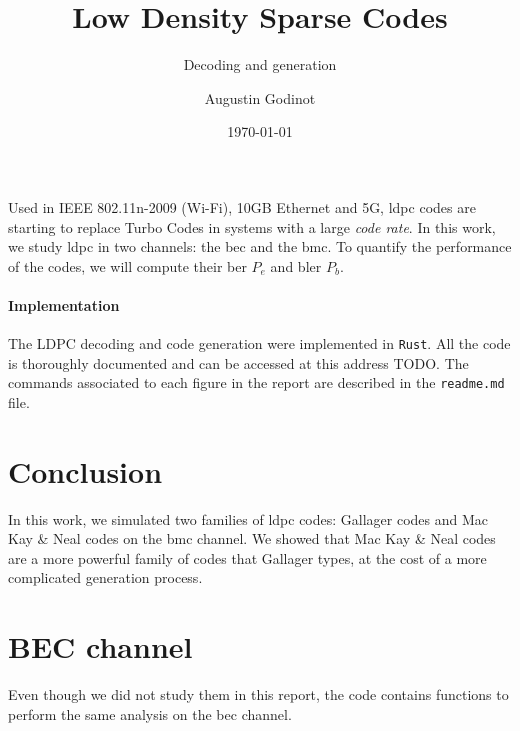 \documentclass[a4paper]{color-report}
\title{Low Density Sparse Codes}
\author{Augustin Godinot}
\date{\today}
\subtitle{Decoding and generation}
\begin{document}
\maketitle
\tableofcontents
\listoffigures
\listoftables
\printglossary[type=\acronymtype, title=Acronyms]
\newpage

Used in IEEE 802.11n-2009 (Wi-Fi), 10GB Ethernet and 5G, \acrshort{ldpc} codes
are starting to replace Turbo Codes in systems with a large \textit{code rate}.
In this work, we study \acrfull{ldpc} in two channels: the \acrfull{bec} and the
\acrfull{bmc}. To quantify the performance of the codes, we will compute their
\acrfull{ber} $P_e$ and \acrfull{bler} $P_b$.

\paragraph{Implementation} The LDPC decoding and code generation were
implemented in \texttt{Rust}. All the code is thoroughly documented and can be
accessed at this address TODO. The commands associated to each figure in the
report are described in the \texttt{readme.md} file.





\section*{Conclusion}
In this work, we simulated two families of \acrshort{ldpc} codes: Gallager codes
and Mac Kay \& Neal codes on the \acrshort{bmc} channel. We showed that Mac Kay
\& Neal codes are a more powerful family of codes that Gallager types, at the
cost of a more complicated generation process.
\newpage
\appendix

\section{BEC channel}

Even though we did not study them in this report, the code contains functions to
perform the same analysis on the \acrshort{bec} channel.
\end{document}

